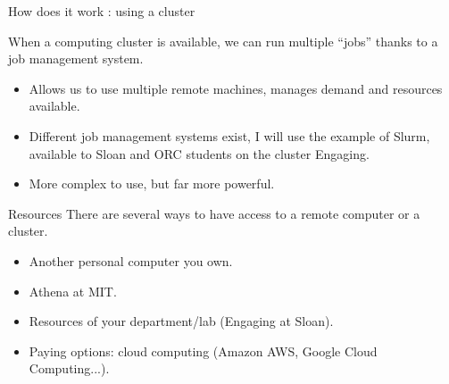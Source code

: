\documentclass{beamer}
\begin{document}
\begin{frame}{How does it work : using a cluster}
  \begin{figure}
  \end{figure}
  When a computing cluster is available, we can run multiple ``jobs'' thanks to a \alert{job management system}.
  \begin{itemize}
    \item Allows us to use multiple remote machines, manages demand and resources available.
    \item Different job management systems exist, I will use the example of Slurm, available to Sloan and ORC students on the cluster \alert{Engaging}.
    \item More complex to use, but far more \alert{powerful}.
  \end{itemize}
\end{frame}

\begin{frame}{Resources}
  There are several ways to have access to a remote computer or a cluster.
  \begin{itemize}
    \item Another personal computer you own.
    \item Athena at MIT.
    \item Resources of your department/lab (Engaging at Sloan).
    \item Paying options: cloud computing (Amazon AWS, Google Cloud Computing...).
  \end{itemize}
\end{frame}
\end{document}
